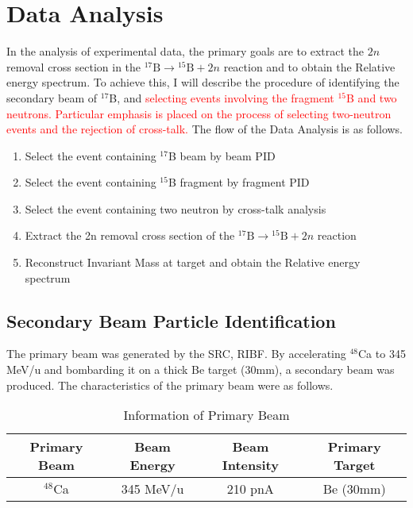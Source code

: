 \chapter{Data Analysis}
In the analysis of experimental data, the primary goals are to extract the $2n$ removal cross section in the ${}^{17}\text{B} \to {}^{15}\text{B} + 2n$ reaction and to obtain the Relative energy spectrum. To achieve this, I will describe the procedure of identifying the secondary beam of ${}^{17}$B, and \textcolor{red}{selecting events involving the fragment ${}^{15}$B and two neutrons. Particular emphasis is placed on the process of selecting two-neutron events and the rejection of cross-talk.} The flow of the Data Analysis is as follows.

\begin{center}
    \begin{enumerate}[noitemsep]
        \item Select the event containing ${}^{17}$B beam by beam PID
        \item Select the event containing ${}^{15}$B fragment by fragment PID
        \item Select the event containing two neutron by cross-talk analysis
        \item Extract the 2n removal cross section of the ${}^{17}\text{B} \to {}^{15}\text{B} + 2n$ reaction
        \item Reconstruct Invariant Mass at target and obtain the Relative energy spectrum 
    \end{enumerate}
\end{center}

\section{Secondary Beam Particle Identification}
The primary beam was generated by the SRC, RIBF. By accelerating ${}^{48}$Ca to 345 MeV/u and bombarding it on a thick Be target (30mm), a secondary beam was produced. The characteristics of the primary beam were as follows.
    \begin{table}[h]
        \centering 
            \begin{tabular}[]{c|c|c|c}
                \hline
                Primary Beam & Beam Energy & Beam Intensity & Primary Target  \\
                \hline 
                ${}^{48}$Ca & 345 MeV/u & 210 pnA & Be (30mm)\\
                \hline    
            \end{tabular}
        \caption{Information of Primary Beam}
    \end{table}

